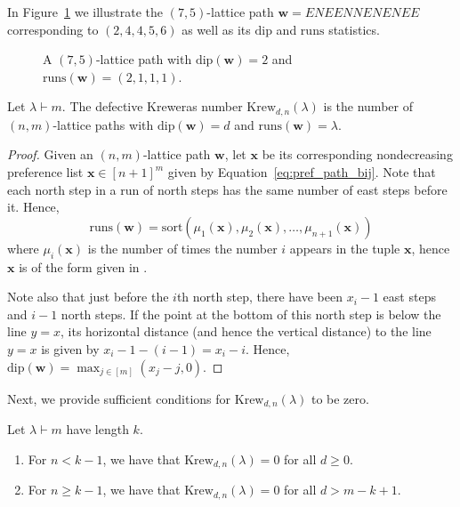 \documentclass[11pt,reqno]{BICA}
\theoremstyle{definition}
\newcommand{\sort}{\mathrm{sort}}
\newcommand{\Krew}{\mathrm{Krew}}
\newcommand{\runs}{\mathrm{runs}}
\newcommand{\dip}{\mathrm{dip}}
\newcommand{\x}{\mathbf{x}}
\newcommand{\w}{\mathbf{w}}
\begin{document}
\begin{example} In Figure~\ref{fig:picture} we illustrate the $(7,5)$-lattice path $\w=ENEENNENENEE$ corresponding to $(2, 4, 4, 5, 6)$ as well as its $\dip$ and $\runs$ statistics.
\begin{figure}[h]
    \centering
{}
    \caption{A $(7,5)$-lattice path with $
    \dip(\w)=2$ and 
    $\runs(\w)=(2,1,1,1)$.
}
    \label{fig:picture}
\end{figure}
\end{example}

\begin{proposition}
    Let $\lambda\vdash m$. The defective Kreweras number $\Krew_{d,n}(\lambda)$ is the number of $(n,m)$-lattice paths with $\dip(\w)=d$ and $\runs(\w)=\lambda$.
\end{proposition}

\begin{proof}
    Given an $(n,m)$-lattice path $\w$, let $\x$ be its corresponding nondecreasing preference list $\x\in[n+1]^m$ given by Equation~\ref{eq:pref_path_bij}. Note that each north step in a run of north steps has the same number of east steps before it. Hence, \[\mathrm{runs}(\w)=\sort(\mu_1(\x),\mu_2(\x),\ldots,\mu_{n+1}(\x))\] where $\mu_i(\x)$ is the number of times the number $i$ appears in the tuple $\x$, hence $\x$ is of the form given in . 

    Note also that just before the $i$th north step, there have been $x_i-1$ east steps and $i-1$ north steps. If the point at the bottom of this north step is below the line $y=x$, its horizontal distance (and hence the vertical distance) to the line $y=x$ is given by $x_i-1-(i-1)=x_i-i$. Hence, $\dip(\w)=\max_{j\in [m]}(x_j-j,0)$.
\end{proof}

Next, we provide sufficient conditions for $\Krew_{d,n}(\lambda)$ to be zero.

\begin{proposition}
    Let $\lambda\vdash m$ have length $k$. \begin{enumerate}
    \item For $n<k-1$, we have that $\Krew_{d,n}(\lambda)=0$ for all $d\geq0$.
    \item For $n\geq k-1$, we have that $\Krew_{d,n}(\lambda)=0$ for all $d> m-k+1$.
    \end{enumerate}
\end{proposition}
\end{document}
